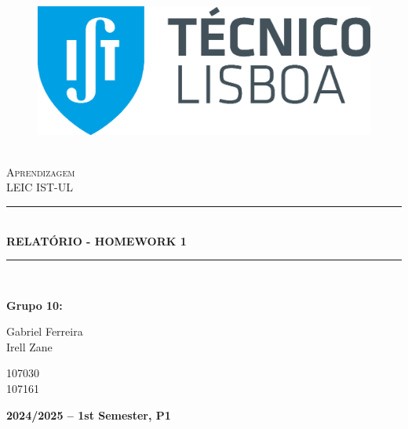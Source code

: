 \documentclass{article}
\newcommand{\HRule}[1]{\rule{\linewidth}{#1}}
\begin{document}
\begin{center}
  \begin{figure}
    \includegraphics[scale = 0.3, left]{img/IST_A.eps} %
    \end{figure}
  \LARGE{ \normalsize \textsc{} \\
  [2.0cm] 
  \LARGE{ \LARGE \textsc{Aprendizagem}} \\
  [1cm]
  \LARGE{ \LARGE \textsc{LEIC IST-UL}} \\
  [1cm]
  \HRule{1.5pt} \\
  [0.4cm]
  \LARGE \textbf{\uppercase{Relatório - Homework 1}}
  \HRule{1.5pt}
  \\ [2.5cm]
  }
\end{center}

\begin{flushleft}
  \textbf{\LARGE Grupo 10:}
\end{flushleft}

\begin{center}
  \begin{minipage}{0.7\textwidth}
      \begin{flushleft}
        \large Gabriel Ferreira \\
        \large  Irell Zane
      \end{flushleft}
  \end{minipage}%
  \begin{minipage}{0.3\textwidth}
      \begin{flushright}
        \large 107030\\
        \large 107161
      \end{flushright}
  \end{minipage}
\end{center}

\begin{center}
  \vspace{4cm}
  \date \large \bf  2024/2025 -- 1st Semester, P1
\end{center}
\end{document}
